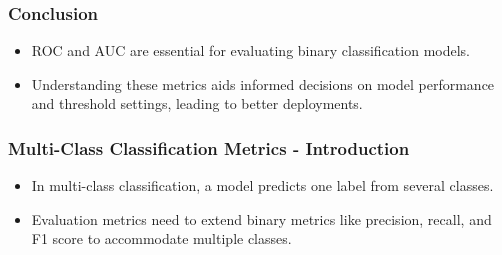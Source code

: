 \documentclass{beamer}
\begin{document}
\begin{frame}[fragile]
    \frametitle{Conclusion}
    \begin{itemize}
        \item ROC and AUC are essential for evaluating binary classification models.
        \item Understanding these metrics aids informed decisions on model performance and threshold settings, leading to better deployments.
    \end{itemize}
\end{frame}

\begin{frame}[fragile]
    \frametitle{Multi-Class Classification Metrics - Introduction}
    \begin{itemize}
        \item In multi-class classification, a model predicts one label from several classes.
        \item Evaluation metrics need to extend binary metrics like precision, recall, and F1 score to accommodate multiple classes.
    \end{itemize}
\end{frame}
\end{document}
